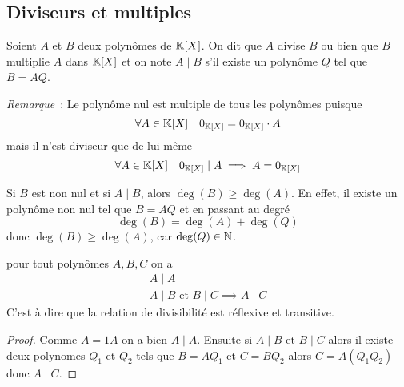 \subsection{Diviseurs et multiples}

\begin{defdef}
  Soient \(A\) et \(B\) deux polynômes de \(\mathbb{K}[X]\). On dit que \(A\) divise
  \(B\) ou bien que \(B\) multiplie \(A\) dans \(\mathbb{K}[X]\) et on note \(A\mid{}B\)
  s'il existe un polynôme \(Q\) tel que \(B = AQ\).
\end{defdef}

\emph{Remarque}~: Le polynôme nul est multiple de tous les polynômes puisque
\begin{equation}
  \forall A \in \mathbb{K}[X] \quad 0_{\mathbb{K}[X]} = 0_{\mathbb{K}[X]} \cdot A
\end{equation}
mais il n'est diviseur que de lui-même
\begin{equation}
  \forall A \in \mathbb{K}[X] \quad 0_{\mathbb{K}[X]}\mid{}A \implies A = 0_{\mathbb{K}[X]}
\end{equation}

Si \(B\) est non nul et si \(A\mid{}B\), alors \(\deg(B) \geqslant \deg(A)\). En
effet, il existe un polynôme non nul tel que \(B = AQ\) et en passant au degré
\begin{equation}
  \deg(B) = \deg(A)+\deg(Q)
\end{equation}
donc \(\deg(B) \geqslant \deg(A)\), car \(\deg(Q)\in \mathbb{N}\).

\begin{prop}
  pour tout polynômes \(A,B,C\) on a
  \begin{align}
    A\mid{}A \\
    A\mid{}B \text{~et~} B\mid{}C \implies A\mid{}C
  \end{align}
  C'est à dire que la relation de divisibilité est réflexive et transitive.
\end{prop}
\begin{proof}
  Comme \(A = 1 A\) on a bien \(A\mid{}A\). Ensuite si \(A\mid{}B \text{~et~}
  B\mid{}C\) alors il existe deux polynomes \(Q_1\) et \(Q_2\) tels que
  \(B = AQ_1\) et \(C = BQ_2\) alors \(C = A(Q_1Q_2)\) donc \(A\mid{}C\).
\end{proof}

